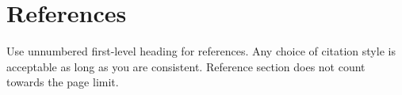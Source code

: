 \documentclass{article}
\begin{document}
            


    \section*{References}
        Use unnumbered first-level heading for references.
        Any choice of citation style is acceptable as long as you are consistent.
        Reference section does not count towards the page limit.
    \medskip
    
    



\end{document}
